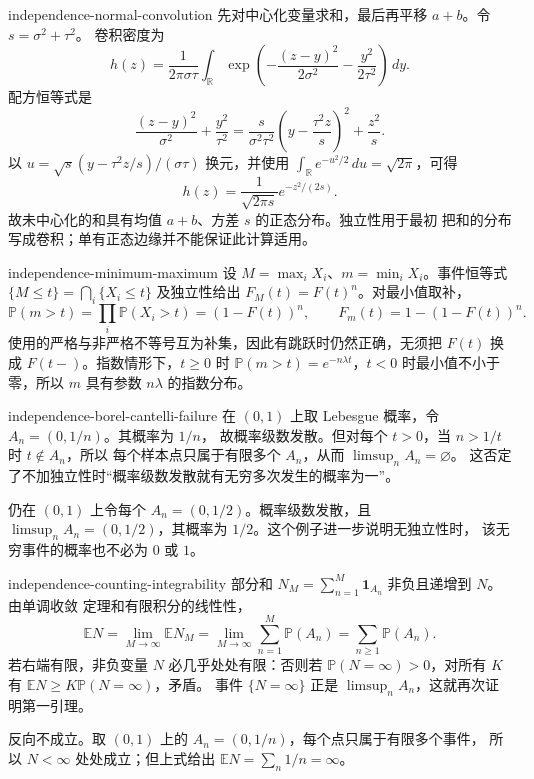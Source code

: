 \begin{solution}{independence-normal-convolution}
先对中心化变量求和，最后再平移 $a+b$。令 $s=\sigma^2+\tau^2$。
卷积密度为
\[
 h(z)=\frac1{2\pi\sigma\tau}\int_{\mathbb R}
  \exp\left(-\frac{(z-y)^2}{2\sigma^2}-\frac{y^2}{2\tau^2}\right)\,dy.
\]
配方恒等式是
\[
 \frac{(z-y)^2}{\sigma^2}+\frac{y^2}{\tau^2}
 =\frac{s}{\sigma^2\tau^2}
    \left(y-\frac{\tau^2z}{s}\right)^2+\frac{z^2}{s}.
\]
以 $u=\sqrt{s}(y-\tau^2z/s)/(\sigma\tau)$ 换元，并使用
$\int_{\mathbb R}e^{-u^2/2}\,du=\sqrt{2\pi}$，可得
\[
 h(z)=\frac1{\sqrt{2\pi s}}e^{-z^2/(2s)}.
\]
故未中心化的和具有均值 $a+b$、方差 $s$ 的正态分布。独立性用于最初
把和的分布写成卷积；单有正态边缘并不能保证此计算适用。
\end{solution}

\begin{solution}{independence-minimum-maximum}
设 $M=\max_iX_i$、$m=\min_iX_i$。事件恒等式
$\{M\le t\}=\bigcap_i\{X_i\le t\}$ 及独立性给出
$F_M(t)=F(t)^n$。对最小值取补，
\[
 \mathbb P(m>t)=\prod_i\mathbb P(X_i>t)=(1-F(t))^n,
 \qquad F_m(t)=1-(1-F(t))^n.
\]
使用的严格与非严格不等号互为补集，因此有跳跃时仍然正确，无须把
$F(t)$ 换成 $F(t-)$。指数情形下，$t\ge0$ 时
$\mathbb P(m>t)=e^{-n\lambda t}$，$t<0$ 时最小值不小于零，所以 $m$
具有参数 $n\lambda$ 的指数分布。
\end{solution}

\begin{solution}{independence-borel-cantelli-failure}
在 $(0,1)$ 上取 Lebesgue 概率，令 $A_n=(0,1/n)$。其概率为 $1/n$，
故概率级数发散。但对每个 $t>0$，当 $n>1/t$ 时 $t\notin A_n$，所以
每个样本点只属于有限多个 $A_n$，从而 $\limsup_nA_n=\varnothing$。
这否定了不加独立性时“概率级数发散就有无穷多次发生的概率为一”。

仍在 $(0,1)$ 上令每个 $A_n=(0,1/2)$。概率级数发散，且
$\limsup_nA_n=(0,1/2)$，其概率为 $1/2$。这个例子进一步说明无独立性时，
该无穷事件的概率也不必为 $0$ 或 $1$。
\end{solution}

\begin{solution}{independence-counting-integrability}
部分和 $N_M=\sum_{n=1}^M\mathbf 1_{A_n}$ 非负且递增到 $N$。由单调收敛
定理和有限积分的线性性，
\[
 \mathbb E N=\lim_{M\to\infty}\mathbb E N_M
 =\lim_{M\to\infty}\sum_{n=1}^M\mathbb P(A_n)
 =\sum_{n\ge1}\mathbb P(A_n).
\]
若右端有限，非负变量 $N$ 必几乎处处有限：否则若
$\mathbb P(N=\infty)>0$，对所有 $K$ 有
$\mathbb E N\ge K\mathbb P(N=\infty)$，矛盾。
事件 $\{N=\infty\}$ 正是 $\limsup_nA_n$，这就再次证明第一引理。

反向不成立。取 $(0,1)$ 上的 $A_n=(0,1/n)$，每个点只属于有限多个事件，
所以 $N<\infty$ 处处成立；但上式给出
$\mathbb E N=\sum_n1/n=\infty$。
\end{solution}

